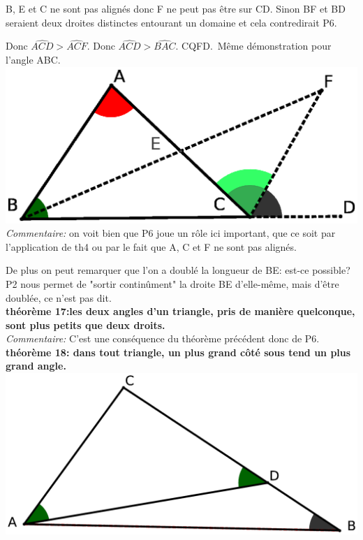\documentclass[a4paper, 12pt, twoside]{book}
\begin{document}
   
    B, E et C ne sont pas alignés donc F ne peut pas être sur CD. Sinon BF et BD seraient deux droites distinctes entourant un domaine et cela contredirait P6.\
    
     Donc   $\hat{ACD}>\hat{ACF}$. Donc $\hat{ACD}>\hat{BAC}$. CQFD.\
    Même démonstration pour l'angle ABC.\\
    
    
   
   \includegraphics[scale=0.5]{figures/LIVRE1&16.eps} \\
   
  \textit{Commentaire:} on voit bien que P6 joue un rôle ici important, que ce soit par l'application de th4 ou par le fait que A, C et F ne sont pas alignés.\
  
  De plus on peut remarquer que l'on a doublé la longueur de BE: est-ce possible? P2 nous permet de "sortir continûment" la droite BE d'elle-même, mais d'être doublée, ce n'est pas dit.\\
  
  
  
  \newpage \textbf{théorème 17:les deux angles d'un triangle, pris de manière quelconque, sont plus petits que deux droits.}\\
  
 \textit{Commentaire:} C'est une conséquence du théorème précédent donc de P6.\\
 
 
\textbf{théorème 18:  dans tout triangle, un plus grand côté sous tend un plus grand angle.}\\
 
 \includegraphics[scale=0.2]{figures/th18.eps}\\ 
 
\end{document}
